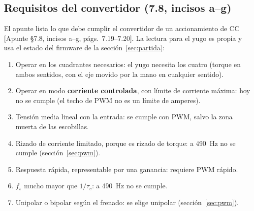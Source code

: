 \documentclass[11pt,a4paper]{article}
\newcommand{\fuente}[1]{{\footnotesize\textcolor{black!60}{[#1]}}}
\begin{document}
\subsection{Requisitos del convertidor (7.8, incisos a--g)}
El apunte lista lo que debe cumplir el convertidor de un accionamiento de CC \fuente{Apunte §7.8, incisos a--g, págs.~7.19--7.20}. La lectura para el yugo es propia y usa el estado del firmware de la sección~\ref{sec:partida}:
\begin{enumerate}[label=\alph*)]
\item Operar en los cuadrantes necesarios: el yugo necesita los cuatro (torque en ambos sentidos, con el eje movido por la mano en cualquier sentido).
\item Operar en modo \textbf{corriente controlada}, con límite de corriente máxima: hoy no se cumple (el techo de PWM no es un límite de amperes).
\item Tensión media lineal con la entrada: se cumple con PWM, salvo la zona muerta de las escobillas.
\item Rizado de corriente limitado, porque es rizado de torque: a 490~Hz no se cumple (sección~\ref{sec:pwm}).
\item Respuesta rápida, representable por una ganancia: requiere PWM rápido.
\item $f_s$ mucho mayor que $1/\tau_e$: a 490~Hz no se cumple.
\item Unipolar o bipolar según el frenado: se elige unipolar (sección~\ref{sec:pwm}).
\end{enumerate}
\end{document}
